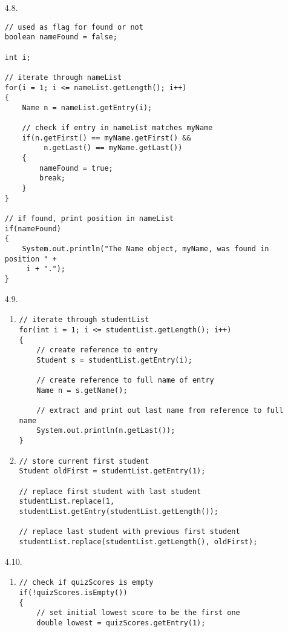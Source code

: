 \documentclass[10pt]{article}
\begin{document}
\begin{enumerate}
		\item[4.8.]
			\begin{lstlisting}
// used as flag for found or not
boolean nameFound = false;

int i;

// iterate through nameList
for(i = 1; i <= nameList.getLength(); i++)
{
    Name n = nameList.getEntry(i);
    
    // check if entry in nameList matches myName
    if(n.getFirst() == myName.getFirst() &&
         n.getLast() == myName.getLast())
    {
        nameFound = true;
        break;
    }
}

// if found, print position in nameList
if(nameFound)
{
    System.out.println("The Name object, myName, was found in position " +
     i + ".");
}
			\end{lstlisting}
		
		\item[4.9.]
			\begin{enumerate}
				\item
					\begin{lstlisting}
// iterate through studentList
for(int i = 1; i <= studentList.getLength(); i++)
{
    // create reference to entry
    Student s = studentList.getEntry(i);
    
    // create reference to full name of entry
    Name n = s.getName();
    
    // extract and print out last name from reference to full name
    System.out.println(n.getLast());
}
					\end{lstlisting}
				
				\item
					\begin{lstlisting}
// store current first student
Student oldFirst = studentList.getEntry(1);

// replace first student with last student
studentList.replace(1, studentList.getEntry(studentList.getLength());

// replace last student with previous first student
studentList.replace(studentList.getLength(), oldFirst);
					\end{lstlisting}
			\end{enumerate}
		
		\item[4.10.]
			\begin{enumerate}
				\item
					\begin{lstlisting}
// check if quizScores is empty
if(!quizScores.isEmpty())
{
    // set initial lowest score to be the first one
    double lowest = quizScores.getEntry(1);
    

\end{lstlisting}
\end{enumerate}
\end{enumerate}
\end{document}

